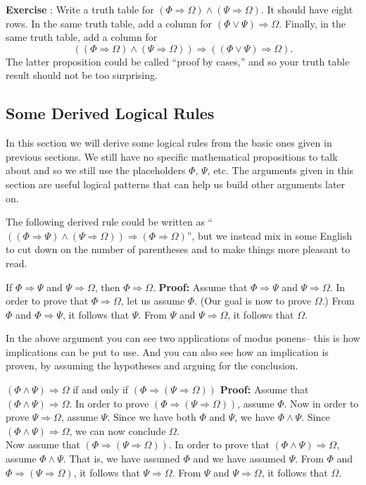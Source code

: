 \documentclass[12pt]{article}
\newcommand{\AND}{\wedge}
\newcommand{\OR}{\vee}
\newcommand{\ARR}{\Rightarrow}
\newcounter{exercise}
\newcounter{rule}
\def\putExerciseHeading{\refstepcounter{exercise} \textbf{Exercise \theexercise}}
\def\putRuleNumber{\refstepcounter{rule}\therule}
\newcommand{\ex}[1]{ \putExerciseHeading: #1}
\newcommand{\DRULEPF}[3]{\begin{tcolorbox}[title=Derived Rule \putRuleNumber: #1,colbacktitle=white,coltitle=black,colback=white] {#2} \tcblower \textbf{Proof:} {#3} \end{tcolorbox}}
\def\pA{\Phi}
\def\pB{\Psi}
\def\pC{\Omega}
\begin{document}
\ex{
Write a truth table for $(\pA\ARR\pC)\AND(\pB\ARR\pC)$. It should have eight rows.
In the same truth table, add a column for $(\pA\OR\pB)\ARR\pC$.
Finally, in the same truth table, add a column for 
$$((\pA\ARR\pC)\AND(\pB\ARR\pC))\ARR((\pA\OR\pB)\ARR\pC).$$
The latter proposition could be called ``proof by cases,'' and so your truth table result should not be too surprising.
}

\subsection{Some Derived Logical Rules}
\label{sec:derived1}

In this section we will derive some logical rules from the basic ones given in previous sections.
We still have no specific mathematical propositions to talk about and so we still use the placeholders $\pA$, $\pB$, etc.
The arguments given in this section are useful logical patterns that can help us build other arguments later on.

The following derived rule could be written as ``$((\pA\ARR\pB)\AND(\pB\ARR\pC))\ARR(\pA\ARR\pC)$'',
but we instead mix in some English to cut down on the number of parentheses and to make things more pleasant to read.

\DRULEPF{Transitivity of Implication\label{DRULE:trans_impl}}{
If $\pA\ARR\pB$ and $\pB\ARR\pC$, then $\pA\ARR\pC$.
}{
Assume that $\pA\ARR\pB$ and $\pB\ARR\pC$.
In order to prove that $\pA\ARR\pC$, let us assume $\pA$.
(Our goal is now to prove $\pC$.)
From $\pA$ and $\pA\ARR\pB$, it follows that $\pB$.
From $\pB$ and $\pB\ARR\pC$, it follows that $\pC$.
}

In the above argument you can see two applications of modus ponens-- this is how implications can be put to use.
And you can also see how an implication is proven, by assuming the hypotheses and arguing for the conclusion.

\def\lsp{\\[-0.4em]}

\DRULEPF{Conjunction and Implication}{
$(\pA\AND\pB)\ARR\pC$ if and only if $(\pA\ARR(\pB\ARR\pC))$
}{
Assume that $(\pA\AND\pB)\ARR\pC$.
In order to prove $(\pA\ARR(\pB\ARR\pC))$, assume $\pA$.
Now in order to prove $\pB\ARR\pC$, assume $\pB$.
Since we have both $\pA$ and $\pB$, we have $\pA\AND\pB$.
Since $(\pA\AND\pB)\ARR\pC$, we can now conclude $\pC$.\lsp

Now assume that $(\pA\ARR(\pB\ARR\pC))$.
In order to prove that $(\pA\AND\pB)\ARR\pC$,
assume $\pA\AND\pB$.
That is, we have assumed $\pA$ and we have assumed $\pB$.
From $\pA$ and $\pA\ARR(\pB\ARR\pC)$, it follows that $\pB\ARR\pC$.
From $\pB$ and $\pB\ARR\pC$, it follows that $\pC$.
}
\end{document}
